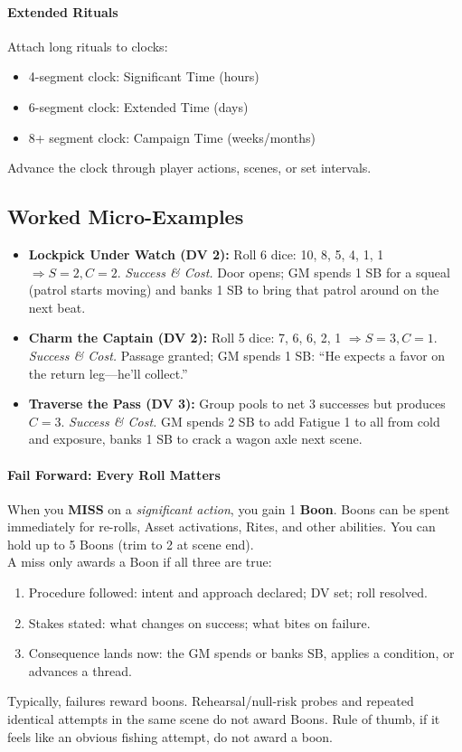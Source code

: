 \paragraph{Extended Rituals}
Attach long rituals to clocks:
\begin{itemize}
  \item 4-segment clock: Significant Time (hours)
  \item 6-segment clock: Extended Time (days)
  \item 8+ segment clock: Campaign Time (weeks/months)
\end{itemize}
Advance the clock through player actions, scenes, or set intervals.

\subsection{Worked Micro-Examples}
\begin{itemize}
  \item \textbf{Lockpick Under Watch (DV 2):} Roll 6 dice: 10, 8, 5, 4, 1, 1 $\Rightarrow S=2, C=2$. \emph{Success \& Cost.} Door opens; GM spends 1 SB for a squeal (patrol starts moving) and banks 1 SB to bring that patrol around on the next beat.
  \item \textbf{Charm the Captain (DV 2):} Roll 5 dice: 7, 6, 6, 2, 1 $\Rightarrow S=3, C=1$. \emph{Success \& Cost.} Passage granted; GM spends 1 SB: ``He expects a favor on the return leg—he'll collect.''
  \item \textbf{Traverse the Pass (DV 3):} Group pools to net 3 successes but produces $C=3$. \emph{Success \& Cost.} GM spends 2 SB to add Fatigue 1 to all from cold and exposure, banks 1 SB to crack a wagon axle next scene.
\end{itemize}

\paragraph{Fail Forward: Every Roll Matters}
When you \textbf{MISS} on a \emph{significant action}, you gain 1 \textbf{Boon}. Boons can be spent immediately for re-rolls, Asset activations, Rites, and other abilities. You can hold up to 5 Boons (trim to 2 at scene end).\\
A miss only awards a Boon if all three are true:
\begin{enumerate}
  \item Procedure followed: intent and approach declared; DV set; roll resolved.
  \item Stakes stated: what changes on success; what bites on failure.
  \item Consequence lands now: the GM spends or banks SB, applies a condition, or advances a thread.
\end{enumerate}
Typically, failures reward boons. Rehearsal/null-risk probes and repeated identical attempts in the same scene do not award Boons. Rule of thumb, if it feels like an obvious fishing attempt, do not award a boon.
